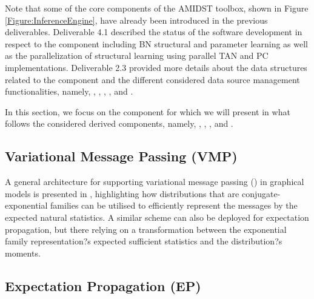 Note that some of the core components of the AMIDST toolbox, shown in Figure \ref{Figure:InferenceEngine}, have already been introduced in the previous deliverables. Deliverable 4.1 \cite{Deliverable4.1} described the status of the software development in respect to the  component including BN structural and parameter learning as well as the parallelization of structural learning using parallel TAN and PC implementations. Deliverable 2.3 \cite{Deliverable2.3} provided more details about the data structures related to the  component and the different considered data source management functionalities, namely, , , , , and .

In this section, we focus on the  component for which we will present in what follows the considered derived components, namely, , , , and .


\subsection{Variational Message Passing (VMP)} \label{VMP}

A general architecture for supporting variational message passing () in graphical models is presented in \cite{Bishop2005}, highlighting how distributions that are conjugate-exponential families \cite{Attias2000,Beal2003,Bishop2005} can be utilised to efficiently represent the messages by the expected natural statistics. A similar scheme can also be deployed for expectation propagation, but there relying on a transformation between the exponential family representation?s expected sufficient statistics and the distribution?s moments.


\subsection{Expectation Propagation (EP)} \label{EP}

